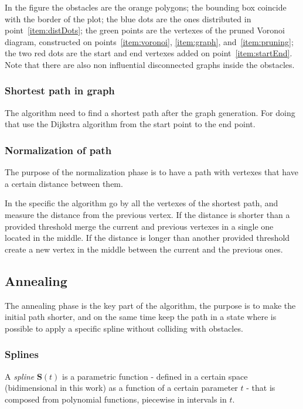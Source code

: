 \documentclass[a4paper]{article}
\begin{document}
In the figure the obstacles are the orange polygons; the bounding box
coincide with the border of the plot; the blue dots are the ones
distributed in point~\ref{item:distDots}; the green points are the
vertexes of the pruned Voronoi diagram, constructed on
points~\ref{item:voronoi}, \ref{item:graph}, and~\ref{item:pruning};
the two red dots are the start and end vertexes added on point~\ref{item:startEnd}.
Note that there are also non influential disconnected graphs inside
the obstacles.

\subsubsection{Shortest path in graph}
The algorithm need to find a shortest path after the graph
generation. For doing that use the Dijkstra algorithm from the start
point to the end point.

\subsubsection{Normalization of path}
The purpose of the normalization phase is to have a path with vertexes
that have a certain distance between them.

In the specific the
algorithm go by all the vertexes of the shortest path, and measure the
distance from the previous vertex. If the distance is shorter than a
provided threshold merge the current and previous vertexes in
a single one located in the middle. If the distance is longer than
another provided threshold create a new vertex in the middle between
the current and the previous ones.

\subsection{Annealing}
The annealing phase is the key part of the algorithm, the purpose is
to make the initial path shorter, and on the same time keep the path
in a state where is possible to apply a specific spline without
colliding with obstacles.

\subsubsection{Splines}\label{sec:spline}
A \emph{spline} $\mathbf{S}(t)$ is a parametric function - defined in a certain space
(bidimensional in this work) as a
function of a certain parameter $t$ - that is composed from polynomial
functions, piecewise in intervals in $t$.
\end{document}
